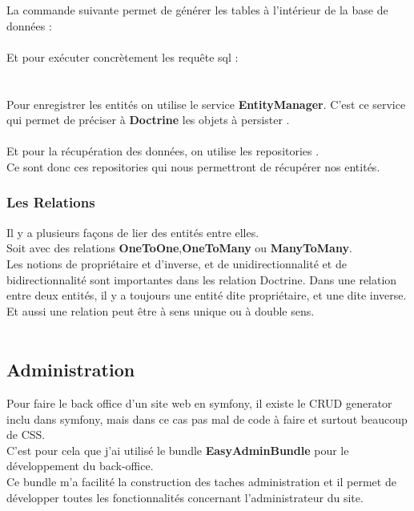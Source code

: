 \documentclass[12pt]{article}
\begin{document}
La commande suivante permet de générer les tables à l'intérieur de la base de données :\\
\\
Et pour exécuter concrètement les requête sql :\\
\\ \\

Pour enregistrer les entités on utilise le service \textbf{EntityManager}. 
 C'est ce service qui permet de préciser à  \textbf{Doctrine} les objets à persister .\\
 
\\

Et pour la récupération des données, on utilise les repositories .\\
Ce sont donc ces repositories qui nous permettront de récupérer nos entités. \\


\subsubsection{Les Relations}
Il y a plusieurs façons de lier des entités entre elles. \\
 Soit avec  des relations \textbf{OneToOne},\textbf{OneToMany} ou \textbf{ManyToMany}. \\
 Les notions de propriétaire et d'inverse, et de  unidirectionnalité et de bidirectionnalité sont  importantes dans les relation Doctrine. Dans une relation entre deux entités, il y a toujours une entité dite propriétaire, et une dite inverse.\\ 
 Et aussi  une relation peut être à sens unique ou à double sens.\\ \\





\subsection{Administration}



 Pour faire le back office d'un  site web en symfony, il existe  le CRUD generator inclu dans symfony, mais dans ce cas pas mal de code à faire et surtout beaucoup de CSS.\\
 C'est pour cela que j'ai utilisé le bundle \textbf{EasyAdminBundle} pour le développement du back-office.\\
 Ce bundle m'a facilité la construction des taches administration et il permet de développer toutes les 
 fonctionnalités concernant  l'administrateur du site.\\ \\
 
\end{document}
